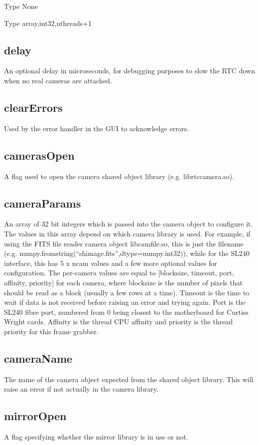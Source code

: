 \documentclass[a4,10pt]{article}
\begin{document}
Type None

Type array,int32,nthreads+1



\subsection{delay}
An optional delay in microseconds, for debugging purposes to slow the
RTC down when no real cameras are attached.

\subsection{clearErrors}
Used by the error handler in the GUI to acknowledge errors.

\subsection{camerasOpen}
A flag used to open the camera shared object library
(e.g. librtccamera.so).  

\subsection{cameraParams}
An array of 32 bit integers which is passed into the camera object to
configure it.  The values in this array depend on which camera library
is used.  For example, if using the FITS file reader camera object
libcamfile.so, this is just the filename
(e.g. numpy.fromstring(``shimage.fits'',dtype=numpy.int32)), while for
the SL240 interface, this has 5 x ncam values and a few more optional
values for configuration.  The per-camera values are equal to
[blocksize, timeout, port, affinity, priority] for each camera, where
blocksize is the number of pixels that should be read as a block
(usually a few rows at a time).  Timeout is the time to wait if data
is not received before raising an error and trying again.  Port is the
SL240 fibre port, numbered from 0 being closest to the motherboard for
Curtiss Wright cards.  Affinity is the thread CPU affinity and
priority is the thread priority for this frame grabber.

\subsection{cameraName}
The name of the camera object expected from the shared object library.
This will raise an error if not actually in the camera library.

\subsection{mirrorOpen}
A flag specifying whether the mirror library is in use or not.
\end{document}
